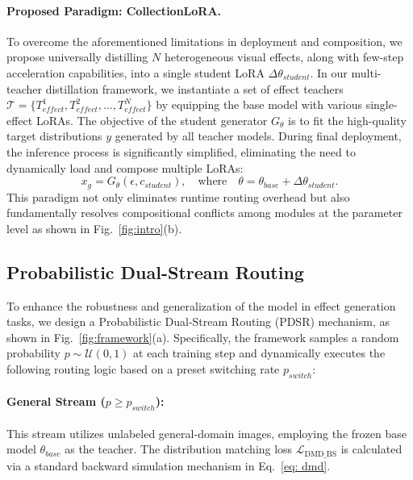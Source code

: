 \paragraph{Proposed Paradigm: CollectionLoRA.}
To overcome the aforementioned limitations in deployment and composition, we propose universally distilling $N$ heterogeneous visual effects, along with few-step acceleration capabilities, into a single student LoRA $\Delta\theta_{student}$.
In our multi-teacher distillation framework, we instantiate a set of effect teachers $\mathcal{T}=\{T_{effect}^{1},T_{effect}^{2},\dots,T_{effect}^{N}\}$ by equipping the base model with various single-effect LoRAs.
The objective of the student generator $G_{\theta}$ is to fit the high-quality target distributions $y$ generated by all teacher models.
During final deployment, the inference process is significantly simplified, eliminating the need to dynamically load and compose multiple LoRAs:
\begin{equation}
    x_{g}=G_{\theta}(\epsilon,c_{student}),\quad\text{where}\quad\theta=\theta_{base}+\Delta\theta_{student}.
\end{equation}
This paradigm not only eliminates runtime routing overhead but also fundamentally resolves compositional conflicts among modules at the parameter level as shown in Fig.~\ref{fig:intro}(b).

\subsection{Probabilistic Dual-Stream Routing}\label{method:4_2}
To enhance the robustness and generalization of the model in effect generation tasks, we design a Probabilistic Dual-Stream Routing (PDSR) mechanism, as shown in Fig.~\ref{fig:framework}(a).
Specifically, the framework samples a random probability $p \sim \mathcal{U}(0,1)$ at each training step and dynamically executes the following routing logic based on a preset switching rate $p_{switch}$:
\paragraph{General Stream ($p \ge p_{switch}$):} This stream utilizes unlabeled general-domain images, employing the frozen base model $\theta_{base}$ as the teacher. The distribution matching loss $\mathcal{L}_{\text{DMD\_BS}}$ is calculated via a standard backward simulation mechanism in Eq.~\ref{eq: dmd}.
